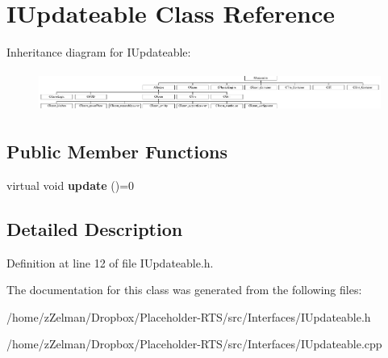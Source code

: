\hypertarget{classIUpdateable}{\section{I\-Updateable Class Reference}
\label{classIUpdateable}
}
Inheritance diagram for I\-Updateable\-:\begin{figure}[H]
\begin{center}
\leavevmode
\includegraphics[height=1.333333cm]{classIUpdateable}
\end{center}
\end{figure}
\subsection*{Public Member Functions}
\begin{DoxyCompactItemize}
\item 
\hypertarget{classIUpdateable_a46d178a1ecdab33bcaad25d9b38582a5}{virtual void {\bfseries update} ()=0}\label{classIUpdateable_a46d178a1ecdab33bcaad25d9b38582a5}

\end{DoxyCompactItemize}


\subsection{Detailed Description}


Definition at line 12 of file I\-Updateable.\-h.



The documentation for this class was generated from the following files\-:\begin{DoxyCompactItemize}
\item 
/home/z\-Zelman/\-Dropbox/\-Placeholder-\/\-R\-T\-S/src/\-Interfaces/I\-Updateable.\-h\item 
/home/z\-Zelman/\-Dropbox/\-Placeholder-\/\-R\-T\-S/src/\-Interfaces/I\-Updateable.\-cpp\end{DoxyCompactItemize}
